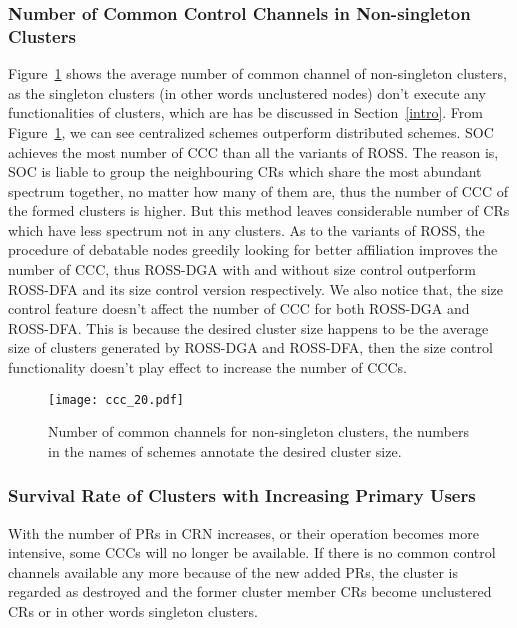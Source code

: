 \documentclass[journal,comsoc]{IEEEtran}
\theoremstyle{mytheoremstyle}
\theoremstyle{mytheoremstyle}
\theoremstyle{mytheoremstyle}
\begin{document}
\subsubsection{Number of Common Control Channels in Non-singleton Clusters}
\label{ccc_20}
Figure~\ref{ccc_per_nonsingleton} shows the average number of common channel of non-singleton clusters, as the singleton clusters (in other words unclustered nodes) don't execute any functionalities of clusters, which are has be discussed in Section~\ref{intro}.
From Figure~\ref{ccc_per_nonsingleton}, we can see centralized schemes outperform distributed schemes.
SOC achieves the most number of CCC than all the variants of ROSS.
The reason is, SOC is liable to group the neighbouring CRs which share the most abundant spectrum together, no matter how many of them are, thus the number of CCC of the formed clusters is higher.
But this method leaves considerable number of CRs which have less spectrum not in any clusters.
As to the variants of ROSS, the procedure of debatable nodes greedily looking for better affiliation improves the number of CCC, thus ROSS-DGA with and without size control outperform ROSS-DFA and its size control version respectively.
We also notice that, the size control feature doesn't affect the number of CCC for both ROSS-DGA and ROSS-DFA.
This is because the desired cluster size happens to be the average size of clusters generated by ROSS-DGA and ROSS-DFA, then the size control functionality doesn't play effect to increase the number of CCCs.


\begin{figure}[h!]
  \centering
  \texttt{[image: ccc\_20.pdf]}
  \caption{Number of common channels for non-singleton clusters, the numbers in the names of schemes annotate the desired cluster size.}
  \label{ccc_per_nonsingleton}
\end{figure}

\subsubsection{Survival Rate of Clusters with Increasing Primary Users}
With the number of PRs in CRN increases, or their operation becomes more intensive, some CCCs will no longer be available.
If there is no common control channels available any more because of the new added PRs, the cluster is regarded as destroyed and the former cluster member CRs become unclustered CRs or in other words singleton clusters.
\end{document}
